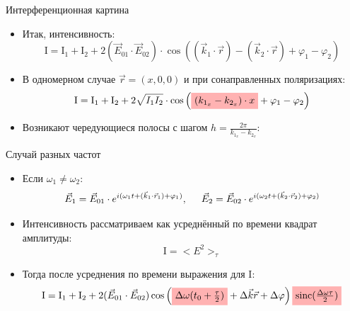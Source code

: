 \documentclass[usenames,dvipsnames,pdftex,unicode,hidelinks]{beamer}
\newcommand{\I}{\mathrm{I}} %
\newcommand{\vect}[1]{\vec{#1}} %
\renewcommand{\phi}{\varphi} %
\newcommand{\mathalert}[1]{
    \tikz[baseline]{
      \node [fill=red!30,anchor=base] {$ #1 $};
    }
  }
\begin{document}
  \begin{frame}{Интерференционная картина}
    \begin{itemize}[<+->]
      \item Итак, интенсивность:
        \[
          \I = \I_1 + \I_2 + 2 (\vect{E}_{01} \cdot \vect{E}_{02}) \cdot \cos \left( (\vect{k}_1\cdot\vect{r}) -
               (\vect{k}_2\cdot\vect{r}) + \phi_1 - \phi_2 \right)
        \]
      \item В одномерном случае $\vect{r} = (x, 0, 0)$ и при сонаправленных поляризациях:
        \[
          \I = \I_1 + \I_2 + 2 \sqrt{I_1 I_2} \cdot \cos \left(
            \mathalert{(k_{1_x} - k_{2_x}) \cdot x}
          + \phi_1 - \phi_2 \right)
        \]
      \item Возникают чередующиеся полосы с шагом $h=\frac{2\pi}{k_{1_x}-k_{2_x}}$:
        \begin{center}
        \end{center}
    \end{itemize}
  \end{frame}

  \begin{frame}{Случай разных частот}
    \begin{itemize}[<+->]
      \item Если $\omega_1 \neq \omega_2$:
        \[
          \vect{E}_1=\vect{E}_{01}\cdot e^{i({\omega}_{1}t + (\vec{k}_1 \cdot \vec{r}_1) + {\phi}_1)},
          \hspace{5mm}
          \vect{E}_2=\vect{E}_{02}\cdot e^{i({\omega}_{2}t + (\vec{k}_2 \cdot \vec{r}_2) + {\phi}_2)}
        \]
      \item Интенсивность рассматриваем как усреднённый по времени квадрат амплитуды:
        \[
          \I = {<{E}}^2{>}_\tau
        \]
      \item Тогда после усреднения по времени выражения для $\I$:
        { \small
        \[
          \I = \I_1 + \I_2 + 2(\vect{E}_{01} \cdot \vect{E}_{02}) \cos \left(
            \mathalert{\Delta\omega (t_0+\frac{\tau}{2})} + \Delta \vect{k}\vect{r} + \Delta\phi
          \right) \mathalert{ \operatorname{sinc}(\frac{\Delta\omega\tau}{2}) }
        \]
        }
    \end{itemize}
    
  \end{frame}
\end{document}
